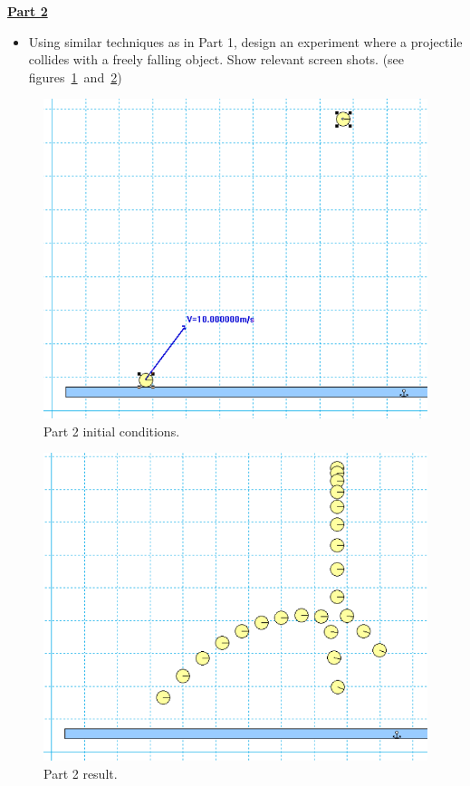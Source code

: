 \underline{\textbf{Part 2}} \par
\begin{itemize}
\item Using similar techniques as in Part 1, design an experiment where a projectile collides with a freely falling object.
Show relevant screen shots. (see figures~\ref{fig:fig2_1}~and~\ref{fig:fig2_2})
\end{itemize}
%
\begin{figure}[H]
\centering
\includegraphics[scale=0.35]{figures/projectileMotion/fig2_1.png}
\caption{Part 2 initial conditions.}
\label{fig:fig2_1}
\end{figure}
%
\begin{figure}[H]
\centering
\includegraphics[scale=0.35]{figures/projectileMotion/fig2_2.png}
\caption{Part 2 result.}
\label{fig:fig2_2}
\end{figure}

\pagebreak \clearpage
